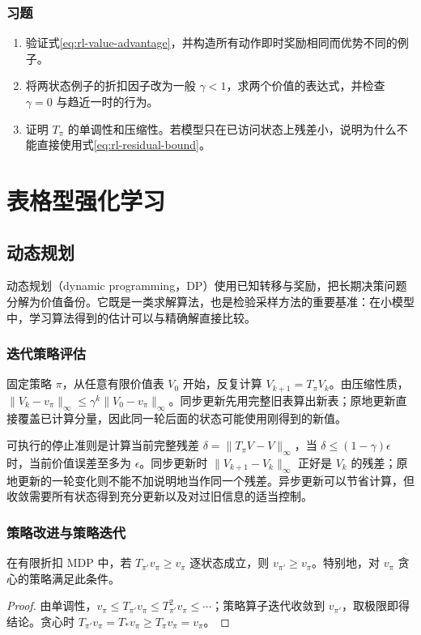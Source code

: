 \documentclass[UTF8,12pt,a4paper,fontset=fandol]{ctexbook}
\begin{document}
\section{习题}
\begin{enumerate}
\item 验证式\eqref{eq:rl-value-advantage}，并构造所有动作即时奖励相同而优势不同的例子。
\item 将两状态例子的折扣因子改为一般 $\gamma<1$，求两个价值的表达式，并检查 $\gamma=0$ 与趋近一时的行为。
\item 证明 $T_\pi$ 的单调性和压缩性。若模型只在已访问状态上残差小，说明为什么不能直接使用式\eqref{eq:rl-residual-bound}。
\end{enumerate}

\part{表格型强化学习}

\chapter{动态规划}
\label{ch:rl-dp}

动态规划（dynamic programming，DP）使用已知转移与奖励，把长期决策问题分解为价值备份。它既是一类求解算法，也是检验采样方法的重要基准：在小模型中，学习算法得到的估计可以与精确解直接比较。

\section{迭代策略评估}

固定策略 $\pi$，从任意有限价值表 $V_0$ 开始，反复计算 $V_{k+1}=T_\pi V_k$。由压缩性质，$\|V_k-v_\pi\|_\infty\leq\gamma^k\|V_0-v_\pi\|_\infty$。同步更新先用完整旧表算出新表；原地更新直接覆盖已计算分量，因此同一轮后面的状态可能使用刚得到的新值。

可执行的停止准则是计算当前完整残差 $\delta=\|T_\pi V-V\|_\infty$，当 $\delta\leq(1-\gamma)\epsilon$ 时，当前价值误差至多为 $\epsilon$。同步更新时 $\|V_{k+1}-V_k\|_\infty$ 正好是 $V_k$ 的残差；原地更新的一轮变化则不能不加说明地当作同一个残差。异步更新可以节省计算，但收敛需要所有状态得到充分更新以及对过旧信息的适当控制。

\section{策略改进与策略迭代}

\begin{theorem}[策略改进]
在有限折扣 MDP 中，若 $T_{\pi'}v_\pi\geq v_\pi$ 逐状态成立，则 $v_{\pi'}\geq v_\pi$。特别地，对 $v_\pi$ 贪心的策略满足此条件。
\end{theorem}
\begin{proof}
由单调性，$v_\pi\leq T_{\pi'}v_\pi\leq T_{\pi'}^2v_\pi\leq\cdots$；策略算子迭代收敛到 $v_{\pi'}$，取极限即得结论。贪心时 $T_{\pi'}v_\pi=T_*v_\pi\geq T_\pi v_\pi=v_\pi$。
\end{proof}
\end{document}
